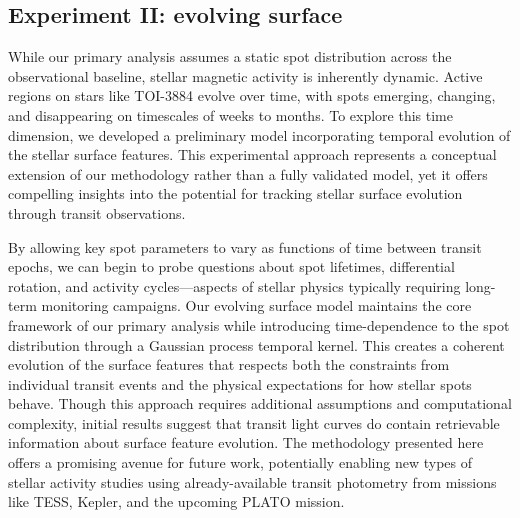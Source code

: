 \documentclass[twocolumn]{aastex631}
\begin{document}
%
%

\subsection{Experiment II: evolving surface}
\label{sec:experiment2}

While our primary analysis assumes a static spot distribution across the observational baseline, stellar magnetic activity is 
inherently dynamic. Active regions on stars like TOI-3884 evolve over time, with spots emerging, changing, and disappearing on 
timescales of weeks to months. To explore this time dimension, we developed a preliminary model incorporating temporal 
evolution of the stellar surface features. This experimental approach represents a conceptual extension of our methodology 
rather than a fully validated model, yet it offers compelling insights into the potential for tracking stellar surface evolution 
through transit observations.

By allowing key spot parameters to vary as functions of time between transit epochs, we can begin to probe questions about spot 
lifetimes, differential rotation, and activity cycles—aspects of stellar physics typically requiring long-term monitoring campaigns. 
Our evolving surface model maintains the core framework of our primary analysis while introducing time-dependence to the 
spot distribution through a Gaussian process temporal kernel. This creates a coherent evolution of the surface features that 
respects both the constraints from individual transit events and the physical expectations for how stellar spots behave.
Though this approach requires additional assumptions and computational complexity, initial results suggest that transit light 
curves do contain retrievable information about surface feature evolution. The methodology presented here offers a 
promising avenue for future work, potentially enabling new types of stellar activity studies using already-available 
transit photometry from missions like TESS, Kepler, and the upcoming PLATO mission.
\end{document}
